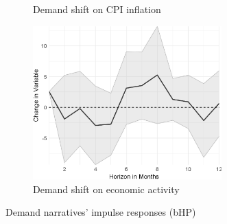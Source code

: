 \begin{figure}
\begin{subfigure}{00.24\textwidth}
		\caption{Demand shift on CPI inflation}
	\end{subfigure}
	\begin{subfigure}{00.24\textwidth}
		\includegraphics[width=0.8\textwidth]{output/lp/baseline/bHP/demand_shift/demand_shiftoneconac_djn.eps}
		\caption{Demand shift on economic activity}
	\end{subfigure}
	\caption{Demand narratives' impulse responses (bHP)}
	\label{fig:irf_1}
\end{figure}
